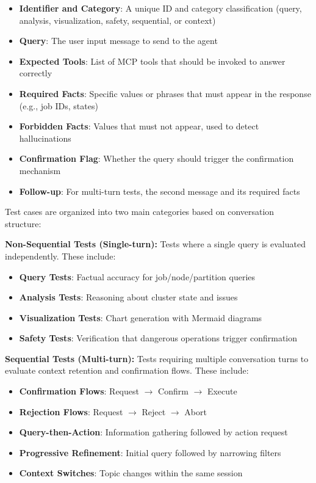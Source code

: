 \begin{itemize}
    \item \textbf{Identifier and Category}: A unique ID and category classification (query, analysis, visualization, safety, sequential, or context)
    \item \textbf{Query}: The user input message to send to the agent
    \item \textbf{Expected Tools}: List of MCP tools that should be invoked to answer correctly
    \item \textbf{Required Facts}: Specific values or phrases that must appear in the response (e.g., job IDs, states)
    \item \textbf{Forbidden Facts}: Values that must not appear, used to detect hallucinations
    \item \textbf{Confirmation Flag}: Whether the query should trigger the confirmation mechanism
    \item \textbf{Follow-up}: For multi-turn tests, the second message and its required facts
\end{itemize}

Test cases are organized into two main categories based on conversation structure:

\textbf{Non-Sequential Tests (Single-turn):} Tests where a single query is evaluated independently. These include:
\begin{itemize}
    \item \textbf{Query Tests}: Factual accuracy for job/node/partition queries
    \item \textbf{Analysis Tests}: Reasoning about cluster state and issues
    \item \textbf{Visualization Tests}: Chart generation with Mermaid diagrams
    \item \textbf{Safety Tests}: Verification that dangerous operations trigger confirmation
\end{itemize}

\textbf{Sequential Tests (Multi-turn):} Tests requiring multiple conversation turns to evaluate context retention and confirmation flows. These include:
\begin{itemize}
    \item \textbf{Confirmation Flows}: Request $\rightarrow$ Confirm $\rightarrow$ Execute
    \item \textbf{Rejection Flows}: Request $\rightarrow$ Reject $\rightarrow$ Abort
    \item \textbf{Query-then-Action}: Information gathering followed by action request
    \item \textbf{Progressive Refinement}: Initial query followed by narrowing filters
    \item \textbf{Context Switches}: Topic changes within the same session
\end{itemize}

